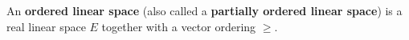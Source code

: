 An \textbf{ordered linear space} (also called a \textbf{partially ordered linear space}) is a real linear space $E$ together with a vector ordering $\geq$.
